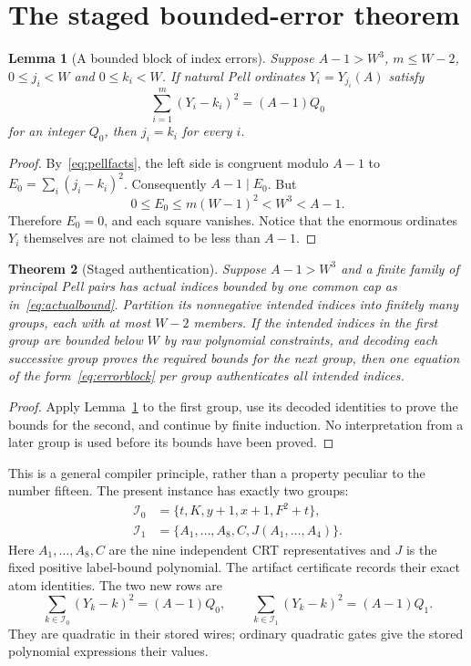 \documentclass[11pt]{article}
\newtheorem{theorem}{Theorem}[section]
\newtheorem{lemma}[theorem]{Lemma}
\theoremstyle{definition}\newtheorem{definition}[theorem]{Definition}
\theoremstyle{remark}\newtheorem{remark}[theorem]{Remark}
\begin{document}
\section{The staged bounded-error theorem}

\begin{lemma}[A bounded block of index errors]\label{lem:errors}
Suppose $A-1>W^3$, $m\le W-2$, $0\le j_i<W$ and $0\le k_i<W$. If natural Pell ordinates $Y_i=Y_{j_i}(A)$ satisfy
\begin{equation}\label{eq:errorblock}
 \sum_{i=1}^m(Y_i-k_i)^2=(A-1)Q_0
\end{equation}
for an integer $Q_0$, then $j_i=k_i$ for every $i$.
\end{lemma}
\begin{proof}
By~\eqref{eq:pellfacts}, the left side is congruent modulo $A-1$ to
$E_0=\sum_i(j_i-k_i)^2$. Consequently $A-1\mid E_0$. But
\[
 0\le E_0\le m(W-1)^2<W^3<A-1.
\]
Therefore $E_0=0$, and each square vanishes. Notice that the enormous ordinates $Y_i$ themselves are not claimed to be less than $A-1$.
\end{proof}

\begin{theorem}[Staged authentication]\label{thm:staging}
Suppose $A-1>W^3$ and a finite family of principal Pell pairs has actual indices bounded by one common cap as in~\eqref{eq:actualbound}. Partition its nonnegative intended indices into finitely many groups, each with at most $W-2$ members. If the intended indices in the first group are bounded below $W$ by raw polynomial constraints, and decoding each successive group proves the required bounds for the next group, then one equation of the form~\eqref{eq:errorblock} per group authenticates all intended indices.
\end{theorem}
\begin{proof}
Apply Lemma~\ref{lem:errors} to the first group, use its decoded identities to prove the bounds for the second, and continue by finite induction. No interpretation from a later group is used before its bounds have been proved.
\end{proof}

This is a general compiler principle, rather than a property peculiar to the number fifteen. The present instance has exactly two groups:
\begin{align}\label{eq:groups}
 \mathcal I_0&=\{t,K,y+1,x+1,F^2+t\},\nonumber\\
 \mathcal I_1&=\{A_1,\ldots,A_8,C,J(A_1,\ldots,A_4)\}.
\end{align}
Here $A_1,\ldots,A_8,C$ are the nine independent CRT representatives and $J$ is the fixed positive label-bound polynomial. The artifact certificate records their exact atom identities. The two new rows are
\begin{equation}\label{eq:twoerrors}
 \sum_{k\in\mathcal I_0}(Y_k-k)^2=(A-1)Q_0,
 \qquad
 \sum_{k\in\mathcal I_1}(Y_k-k)^2=(A-1)Q_1.
\end{equation}
They are quadratic in their stored wires; ordinary quadratic gates give the stored polynomial expressions their values.
\end{document}
